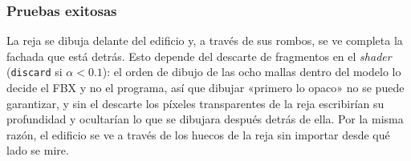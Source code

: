 \subsubsection{Pruebas exitosas}
La reja se dibuja delante del edificio y, a través de sus rombos, se ve completa la fachada que está detrás. Esto depende del descarte de fragmentos en el \textit{shader} (\texttt{discard} si $\alpha < 0.1$): el orden de dibujo de las ocho mallas dentro del modelo lo decide el FBX y no el programa, así que dibujar «primero lo opaco» no se puede garantizar, y sin el descarte los píxeles transparentes de la reja escribirían su profundidad y ocultarían lo que se dibujara después detrás de ella. Por la misma razón, el edificio se ve a través de los huecos de la reja sin importar desde qué lado se mire.
